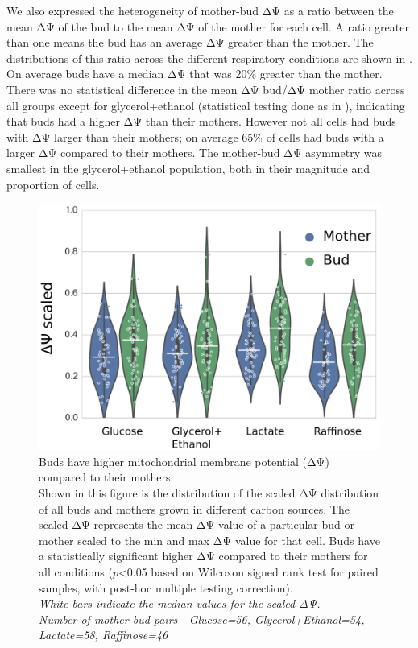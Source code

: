 We also expressed the heterogeneity of mother-bud ΔΨ as a ratio between the mean ΔΨ of the bud to the mean ΔΨ of the mother for each cell. A ratio greater than one means the bud has an average ΔΨ greater than the mother. The distributions of this ratio across the different respiratory conditions are shown in . On average buds have a median ΔΨ that was 20\% greater than the mother. There was no statistical difference in the mean ΔΨ bud/ΔΨ mother ratio across all groups except for glycerol+ethanol (statistical testing done as in ), indicating that buds had a higher ΔΨ than their mothers. However not all cells had buds with ΔΨ larger than their mothers; on average 65\% of cells had buds with a larger ΔΨ compared to their mothers. The mother-bud ΔΨ asymmetry was smallest in the glycerol+ethanol population, both in their magnitude and proportion of cells.
%
\begin{figure}[htp]
	\centering
    \includegraphics[width=.68\textwidth]{mbviol}
    \caption[Buds have higher mitochondrial membrane potential (ΔΨ) compared to their mothers]{Buds have higher mitochondrial membrane potential (ΔΨ) compared to their mothers.\\Shown in this figure is the distribution of the scaled ΔΨ distribution of all buds and mothers grown in different carbon sources. The scaled ΔΨ represents the mean ΔΨ value of a particular bud or mother scaled to the min and max ΔΨ value for that cell. Buds have a statistically significant higher ΔΨ compared to their mothers for all conditions ($p$<0.05 based on Wilcoxon signed rank test for paired samples, with post-hoc multiple testing correction).\\\emph{White bars indicate the median values for the scaled ΔΨ.\\Number of mother-bud pairs---Glucose=56, Glycerol+Ethanol=54, Lactate=58, Raffinose=46}}\label{fig:mbviol}
\end{figure}
